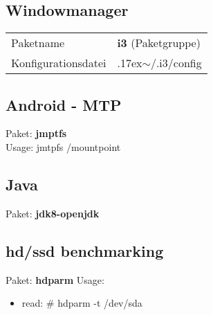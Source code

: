 \subsection{Windowmanager}
\begin{tabular}{l|l}
Paketname & \textbf{i3} (Paketgruppe) \\ 
Konfigurationsdatei & {{\raise.17ex\hbox{$\scriptstyle\mathtt{\sim}$}}/.i3/config} \\
\end{tabular}

\subsection{Android - MTP}
Paket: \textbf{jmptfs} \\ 
Usage: jmtpfs /mountpoint  

\subsection{Java}
Paket: \textbf{jdk8-openjdk}

\subsection{hd/ssd benchmarking}
Paket: \textbf{hdparm}
Usage:
\begin{itemize}
\item{read: \# hdparm -t /dev/sda}
\end{itemize}



